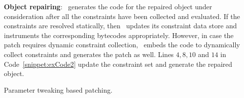 \begin{mylist}

 \item \textbf{Object repairing}: \tool\ generates the code for the repaired
object under consideration after all the constraints have been collected and
evaluated. If the constraints are resolved statically, then \tool\ updates its
constraint data store and instruments the corresponding bytecodes appropriately.
However, in case the patch requires dynamic constraint collection, \tool\ embeds
the code to dynamically collect constraints and generates the patch as well.
Lines $4, 8, 10$ and $14$ in Code~\ref{snippet:exCode2} update the constraint
set and generate the repaired object.

\begin{algorithm}[t]
\scriptsize
\DontPrintSemicolon
{}
\caption{Parameter tweaking based  patching.}
\label{algo:stringPatchParametr}
\end{algorithm}


\end{mylist}
